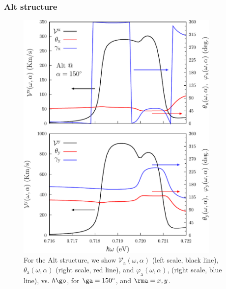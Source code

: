 \documentclass[floatfix,prb,aps,superscriptaddress,showpacs,11pt,preprint,letterpaper]{revtex4}
\def\tama{10cm}
\begin{document}
\subsubsection{Alt structure}

\begin{figure}[tb]
\centering
\includegraphics[width=\tama]{altplots/alt-vx-vy-w1}
\caption{For the Alt structure, we show
$\mathcal{V}_{\mathrm{a}} (\omega,\alpha)$ (left scale, black line),
$\theta_{\mathrm{a}} (\omega,\alpha)$ (right scale, red line), and
$\varphi_{\mathrm{a}} (\omega,\alpha)$, (right scale, blue line), vs.
$\hbar\go$, for $\ga=150^\circ$, and $\rma=x,y$. }
\label{fig:alt-vx-vy-w1}
\end{figure}
\end{document}
